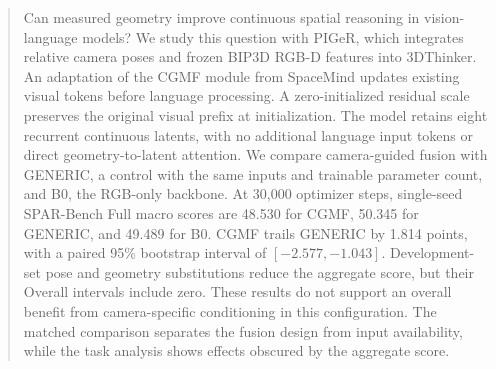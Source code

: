\begin{abstract}
Can measured geometry improve continuous spatial reasoning in vision-language models? We study this question with PIGeR, which integrates relative camera poses and frozen BIP3D RGB-D features into 3DThinker. An adaptation of the CGMF module from SpaceMind updates existing visual tokens before language processing. A zero-initialized residual scale preserves the original visual prefix at initialization. The model retains eight recurrent continuous latents, with no additional language input tokens or direct geometry-to-latent attention. We compare camera-guided fusion with GENERIC, a control with the same inputs and trainable parameter count, and B0, the RGB-only backbone. At 30,000 optimizer steps, single-seed SPAR-Bench Full macro scores are 48.530 for CGMF, 50.345 for GENERIC, and 49.489 for B0. CGMF trails GENERIC by 1.814 points, with a paired 95\% bootstrap interval of $[-2.577,-1.043]$. Development-set pose and geometry substitutions reduce the aggregate score, but their Overall intervals include zero. These results do not support an overall benefit from camera-specific conditioning in this configuration. The matched comparison separates the fusion design from input availability, while the task analysis shows effects obscured by the aggregate score.
\end{abstract}
